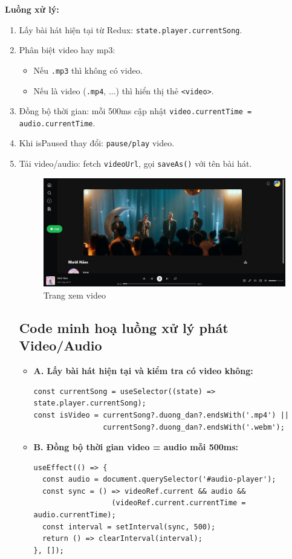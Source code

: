 \textbf{Luồng xử lý:}
\begin{enumerate}
  \item Lấy bài hát hiện tại từ Redux: \texttt{state.player.currentSong}.
  \item Phân biệt video hay mp3:
  \begin{itemize}
    \item Nếu \texttt{.mp3} thì không có video.
    \item Nếu là video (\texttt{.mp4}, ...) thì hiển thị thẻ \texttt{<video>}.
  \end{itemize}
  \item Đồng bộ thời gian: mỗi 500ms cập nhật \texttt{video.currentTime = audio.currentTime}.
  \item Khi isPaused thay đổi: \texttt{pause/play} video.
  \item Tải video/audio: fetch \texttt{videoUrl}, gọi \texttt{saveAs()} với tên bài hát.
  \begin{figure}[H]
    \centering
    \includegraphics[width=1\textwidth]{imgs/chap5/phat_video.png}
    \caption{Trang xem video}
  \end{figure}

  \subsection*{Code minh hoạ luồng xử lý phát Video/Audio}

\begin{itemize}
  \item \textbf{A. Lấy bài hát hiện tại và kiểm tra có video không:}
\begin{verbatim}
const currentSong = useSelector((state) => state.player.currentSong);
const isVideo = currentSong?.duong_dan?.endsWith('.mp4') || 
                currentSong?.duong_dan?.endsWith('.webm');
\end{verbatim}

  \item \textbf{B. Đồng bộ thời gian video = audio mỗi 500ms:}
\begin{verbatim}
useEffect(() => {
  const audio = document.querySelector('#audio-player');
  const sync = () => videoRef.current && audio && 
                  (videoRef.current.currentTime = audio.currentTime);
  const interval = setInterval(sync, 500);
  return () => clearInterval(interval);
}, []);
\end{verbatim}


\end{itemize}
\end{enumerate}
